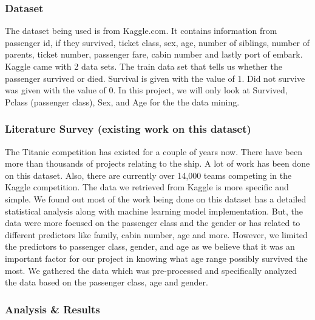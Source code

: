 \documentclass[
]{article}
\begin{document}
\hypertarget{dataset}{%
\subsubsection{\texorpdfstring{\textbf{Dataset}}{Dataset}}\label{dataset}}

The dataset being used is from Kaggle.com. It contains information from
passenger id, if they survived, ticket class, sex, age, number of
siblings, number of parents, ticket number, passenger fare, cabin number
and lastly port of embark. Kaggle came with 2 data sets. The train data
set that tells us whether the passenger survived or died. Survival is
given with the value of 1. Did not survive was given with the value of
0. In this project, we will only look at Survived, Pclass (passenger
class), Sex, and Age for the the data mining.

\hypertarget{literature-survey-existing-work-on-this-dataset}{%
\subsubsection{\texorpdfstring{\textbf{Literature Survey (existing work
on this
dataset)}}{Literature Survey (existing work on this dataset)}}\label{literature-survey-existing-work-on-this-dataset}}

The Titanic competition has existed for a couple of years now. There
have been more than thousands of projects relating to the ship. A lot of
work has been done on this dataset. Also, there are currently over
14,000 teams competing in the Kaggle competition. The data we retrieved
from Kaggle is more specific and simple. We found out most of the work
being done on this dataset has a detailed statistical analysis along
with machine learning model implementation. But, the data were more
focused on the passenger class and the gender or has related to
different predictors like family, cabin number, age and more. However,
we limited the predictors to passenger class, gender, and age as we
believe that it was an important factor for our project in knowing what
age range possibly survived the most. We gathered the data which was
pre-processed and specifically analyzed the data based on the passenger
class, age and gender.

\hypertarget{analysis-results}{%
\subsubsection{\texorpdfstring{\textbf{Analysis \&
Results}}{Analysis \& Results}}\label{analysis-results}}
\end{document}
